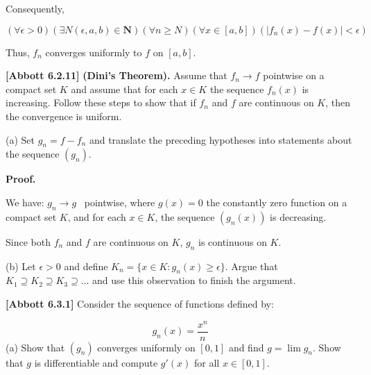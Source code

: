 \documentclass[10pt]{article}
\begin{document}
Consequently,


\begin{equation*}
( \forall \epsilon  >0)( \exists N( \epsilon ,a,b) \in \mathbf{N})( \forall n\geq N)( \forall x\in [ a,b])( |f_{n}( x) -f( x) |< \epsilon )
\end{equation*}


Thus, $\displaystyle f_{n}$ converges uniformly to $\displaystyle f$ on $\displaystyle [ a,b]$. 



\textbf{[Abbott 6.2.11]} \textbf{(Dini's Theorem).} Assume that $\displaystyle f_{n}\rightarrow f$ pointwise on a compact set $\displaystyle K$ and assume that for each $\displaystyle x\in K$ the sequence $\displaystyle f_{n}( x)$ is increasing. Follow these steps to show that if $\displaystyle f_{n}$ and $\displaystyle f$ are continuous on $\displaystyle K$, then the convergence is uniform.



(a) Set $\displaystyle g_{n} =f-f_{n}$ and translate the preceding hypotheses into statements about the sequence $\displaystyle ( g_{n})$.



\textbf{Proof.}



We have: $\displaystyle g_{n}\rightarrow g$ \ pointwise, where $\displaystyle g( x) =0$ the constantly zero function on a compact set $\displaystyle K$, and for each $\displaystyle x\in K$, the sequence $\displaystyle ( g_{n}( x))$ is decreasing. 



Since both $\displaystyle f_{n}$ and $\displaystyle f$ are continuous on $\displaystyle K$, $\displaystyle g_{n}$ is continuous on $\displaystyle K$.



(b) Let $\displaystyle \epsilon  >0$ and define $\displaystyle K_{n} =\{x\in K:g_{n}( x) \geq \epsilon \}$. Argue that $\displaystyle K_{1} \supseteq K_{2} \supseteq K_{3} \supseteq \dotsc $ and use this observation to finish the argument.



\textbf{[Abbott 6.3.1] }Consider the sequence of functions defined by:


\begin{equation*}
g_{n}( x) =\frac{x^{n}}{n}
\end{equation*}
(a) Show that $\displaystyle ( g_{n})$ converges uniformly on $\displaystyle [ 0,1]$ and find $\displaystyle g=\lim g_{n}$. Show that $\displaystyle g$ is differentiable and compute $\displaystyle g'( x)$ for all $\displaystyle x\in [ 0,1]$.
\end{document}
